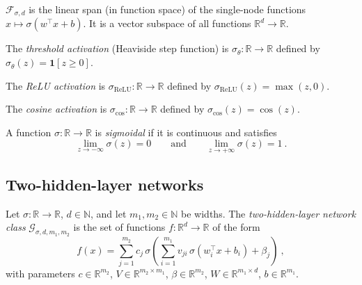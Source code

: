 \begin{remark}
  $\mathcal{F}_{\sigma,d}$ is the linear span (in function space) of the single-node functions $x \mapsto \sigma(w^\top x + b)$.
  It is a vector subspace of all functions $\mathbb{R}^d \to \mathbb{R}$.
\end{remark}

\begin{definition}\label{def:thresholdActivation}
The \emph{threshold activation} (Heaviside step function) is $\sigma_\theta : \mathbb{R} \to \mathbb{R}$ defined by $\sigma_\theta(z) = \mathbf{1}[z \ge 0]$.
\end{definition}

\begin{definition}\label{def:reluActivation}
The \emph{ReLU activation} is $\sigma_\mathrm{ReLU} : \mathbb{R} \to \mathbb{R}$ defined by $\sigma_\mathrm{ReLU}(z) = \max(z, 0)$.
\end{definition}

\begin{definition}\label{def:cosActivation}
The \emph{cosine activation} is $\sigma_{\cos} : \mathbb{R} \to \mathbb{R}$ defined by $\sigma_{\cos}(z) = \cos(z)$.
\end{definition}

\begin{definition}\label{def:sigmoidalActivation}
A function $\sigma : \mathbb{R} \to \mathbb{R}$ is \emph{sigmoidal} if it is continuous and satisfies
\[
  \lim_{z \to -\infty} \sigma(z) = 0
  \qquad \text{and} \qquad
  \lim_{z \to +\infty} \sigma(z) = 1
  \: .
\]
\end{definition}

\subsection{Two-hidden-layer networks}

\begin{definition}\label{def:twoHiddenLayerClass}
Let $\sigma : \mathbb{R} \to \mathbb{R}$, $d \in \mathbb{N}$, and let $m_1, m_2 \in \mathbb{N}$ be widths.
The \emph{two-hidden-layer network class} $\mathcal{G}_{\sigma,d,m_1,m_2}$ is the set of functions $f : \mathbb{R}^d \to \mathbb{R}$ of the form
\[
  f(x) = \sum_{j=1}^{m_2} c_j \, \sigma\!\left(\sum_{i=1}^{m_1} v_{ji} \, \sigma(w_i^\top x + b_i) + \beta_j\right)
  \: ,
\]
with parameters $c \in \mathbb{R}^{m_2}$, $V \in \mathbb{R}^{m_2 \times m_1}$, $\beta \in \mathbb{R}^{m_2}$, $W \in \mathbb{R}^{m_1 \times d}$, $b \in \mathbb{R}^{m_1}$.
\end{definition}


